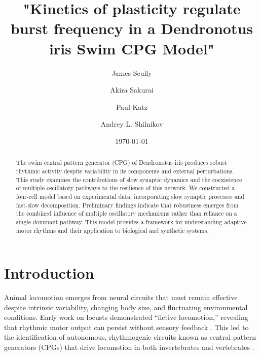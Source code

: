 \documentclass[nofootinbib,aip,amsmath,amssymb,reprint,twocolumn,10pt]{revtex4-2}
\begin{document}
\title{"Kinetics of plasticity regulate burst frequency in a Dendronotus iris Swim CPG Model"}

\author{James Scully}
\author{Akira Sakurai}
\author{Paul Katz}
\author{Andrey L. Shilnikov}


\date{\today}
\begin{abstract}


The swim central pattern generator (CPG) of Dendronotus iris produces robust rhythmic activity despite variability in its components and external perturbations.
This study examines the contributions of slow synaptic dynamics and the coexistence of multiple oscillatory pathways to the resilience of this network.
We constructed a four-cell model based on experimental data, incorporating slow synaptic processes and fast-slow decomposition.
Preliminary findings indicate that robustness emerges from the combined influence of multiple oscillatory mechanisms rather than reliance on a single dominant pathway.
This model provides a framework for understanding adaptive motor rhythms and their application to biological and synthetic systems.
\end{abstract}

\maketitle
\section{Introduction}
Animal locomotion emerges from neural circuits that must remain effective despite intrinsic variability, changing body size, and fluctuating environmental conditions.
Early work on locusts demonstrated ``fictive locomotion,'' revealing that rhythmic motor output can persist without sensory feedback \cite{Wilson1961}.
This led to the identification of autonomous, rhythmogenic circuits known as central pattern generators (CPGs) that drive locomotion in both invertebrates and vertebrates \cite{MarderCalabrese1996, Kiehn2006}.
\end{document}

